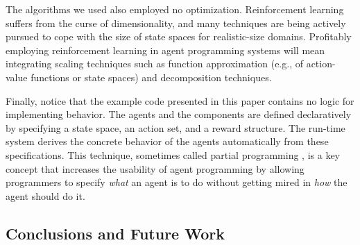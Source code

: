 

The algorithms we used also employed no optimization.  Reinforcement learning suffers from the curse of dimensionality, and many techniques are being actively pursued to cope with the size of state spaces for realistic-size domains.  Profitably employing reinforcement learning in agent programming systems will mean integrating scaling techniques such as function approximation (e.g., of action-value functions or state spaces) and decomposition techniques.

Finally, notice that the example code presented in this paper contains no logic for implementing behavior.  The agents and the components are defined declaratively by specifying a state space, an action set, and a reward structure.  The run-time system derives the concrete behavior of the agents automatically from these specifications.  This technique, sometimes called partial programming \cite{simpkins2008towards}, is a key concept that increases the usability of agent programming by allowing programmers to specify {\em what} an agent is to do without getting mired in {\em how} the agent should do it.

\subsection{Conclusions and Future Work}

